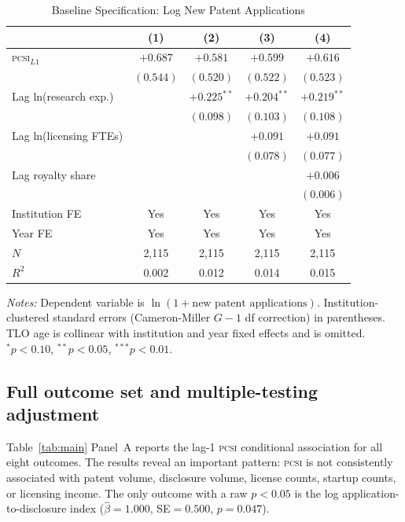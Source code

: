 \documentclass[12pt]{article}
\newcommand{\PCSI}{\textsc{pcsi}}
\begin{document}
\begin{table}[htbp]
\centering
\caption{Baseline Specification: Log New Patent Applications}
\label{tab:baseline}
\begin{threeparttable}
\begin{tabular}{lcccc}
\toprule
 & (1) & (2) & (3) & (4) \\
\midrule
\PCSI{}$_{L1}$ & $+0.687$ & $+0.581$ & $+0.599$ & $+0.616$ \\
 & $(0.544)$ & $(0.520)$ & $(0.522)$ & $(0.523)$ \\
Lag ln(research exp.) & & $+0.225^{**}$ & $+0.204^{**}$ & $+0.219^{**}$ \\
 & & $(0.098)$ & $(0.103)$ & $(0.108)$ \\
Lag ln(licensing FTEs) & & & $+0.091$ & $+0.091$ \\
 & & & $(0.078)$ & $(0.077)$ \\
Lag royalty share & & & & $+0.006$ \\
 & & & & $(0.006)$ \\
\midrule
Institution FE & Yes & Yes & Yes & Yes \\
Year FE & Yes & Yes & Yes & Yes \\
$N$ & 2,115 & 2,115 & 2,115 & 2,115 \\
$R^2$ & 0.002 & 0.012 & 0.014 & 0.015 \\
\bottomrule
\end{tabular}
\begin{tablenotes}
\small
\item \textit{Notes:} Dependent variable is $\ln(1+\text{new patent applications})$.
Institution-clustered standard errors (Cameron-Miller $G-1$ df correction) in
parentheses. TLO age is collinear with institution and year fixed effects and is
omitted. $^*p<0.10$, $^{**}p<0.05$, $^{***}p<0.01$.
\end{tablenotes}
\end{threeparttable}
\end{table}

\subsection{Full outcome set and multiple-testing adjustment}

Table~\ref{tab:main} Panel~A reports the lag-1 \PCSI{} conditional association for
all eight outcomes. The results reveal an important pattern: \PCSI{} is not
consistently associated with patent volume, disclosure volume, license counts,
startup counts, or licensing income. The only outcome with a raw $p < 0.05$ is the
log application-to-disclosure index ($\hat\beta = 1.000$, SE$= 0.500$, $p=0.047$).
\end{document}

